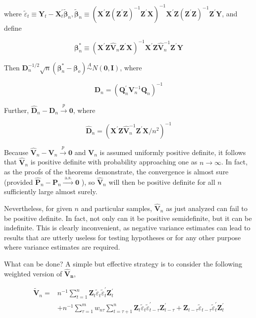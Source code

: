 \documentclass[10pt]{article}
\begin{document}
where $\tilde{\varepsilon}_{t} \equiv \mathbf{Y}_{t}-\mathbf{X}_{t}^{\prime} \tilde{\boldsymbol{\beta}}_{n}, \tilde{\boldsymbol{\beta}}_{n} \equiv\left(\mathbf{X}^{\prime} \mathbf{Z}\left(\mathbf{Z}^{\prime} \mathbf{Z}\right)^{-1} \mathbf{Z}^{\prime} \mathbf{X}\right)^{-1} \mathbf{X}^{\prime} \mathbf{Z}\left(\mathbf{Z}^{\prime} \mathbf{Z}\right)^{-1} \mathbf{Z}^{\prime} \mathbf{Y}$, and define

$$
\boldsymbol{\beta}_{n}^{*} \equiv\left(\mathbf{X}^{\prime} \mathbf{Z} \hat{\mathbf{V}}_{n} \mathbf{Z}^{\prime} \mathbf{X}\right)^{-1} \mathbf{X}^{\prime} \mathbf{Z} \hat{\mathbf{V}}_{n}^{-1} \mathbf{Z}^{\prime} \mathbf{Y}
$$

Then $\mathbf{D}_{n}^{-1 / 2} \sqrt{n}\left(\boldsymbol{\beta}_{n}^{*}-\boldsymbol{\beta}_{o}\right) \stackrel{A}{\sim} N(\mathbf{0}, \mathbf{I})$, where

$$
\mathbf{D}_{n}=\left(\mathbf{Q}_{n}^{\prime} \mathbf{V}_{n}^{-1} \mathbf{Q}_{n}\right)^{-1}
$$

Further, $\hat{\mathbf{D}}_{n}-\mathbf{D}_{n} \xrightarrow{p} \mathbf{0}$, where

$$
\hat{\mathbf{D}}_{n}=\left(\mathbf{X}^{\prime} \mathbf{Z} \hat{\mathbf{V}}_{n}^{-1} \mathbf{Z}^{\prime} \mathbf{X} / n^{2}\right)^{-1}
$$

Because $\hat{\mathbf{V}}_{n}-\mathbf{V}_{n} \xrightarrow{p} \mathbf{0}$ and $\mathbf{V}_{n}$ is assumed uniformly positive definite, it follows that $\hat{\mathbf{V}}_{n}$ is positive definite with probability approaching one as $n \rightarrow \infty$. In fact, as the proofs of the theorems demonstrate, the convergence is almost sure (provided $\hat{\mathbf{P}}_{n}-\mathbf{P}_{n} \xrightarrow{\text { a.s. }} \mathbf{0}$ ), so $\hat{\mathbf{V}}_{n}$ will then be positive definite for all $n$ sufficiently large almost surely.

Nevertheless, for given $n$ and particular samples, $\hat{\mathbf{V}}_{n}$ as just analyzed can fail to be positive definite. In fact, not only can it be positive semidefinite, but it can be indefinite. This is clearly inconvenient, as negative variance estimates can lead to results that are utterly useless for testing hypotheses or for any other purpose where variance estimates are required.

What can be done? A simple but effective strategy is to consider the following weighted version of $\hat{\mathbf{V}}_{\boldsymbol{n}}$,

$$
\begin{aligned}
\tilde{\mathbf{V}}_{n}= & n^{-1} \sum_{t=1}^{n} \mathbf{Z}_{t} \tilde{\varepsilon}_{t} \tilde{\varepsilon}_{t}^{\prime} \mathbf{Z}_{t}^{\prime} \\
& +n^{-1} \sum_{\tau=1}^{m} w_{n \tau} \sum_{t=\tau+1}^{n} \mathbf{Z}_{t} \tilde{\varepsilon}_{t} \tilde{\varepsilon}_{t-\tau}^{\prime} \mathbf{Z}_{t-\tau}^{\prime}+\mathbf{Z}_{t-\tau} \tilde{\varepsilon}_{t-\tau} \tilde{\varepsilon}_{t}^{\prime} \mathbf{Z}_{t}^{\prime}
\end{aligned}
$$
\end{document}
